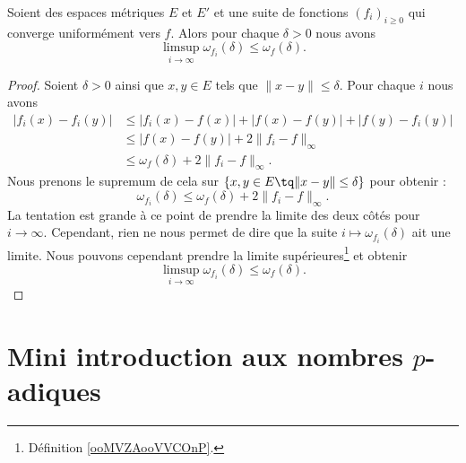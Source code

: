\begin{lemma}        \label{LEMooKPPSooPIncvn}
    Soient des espaces métriques \( E\) et \( E'\) et une suite de fonctions \( (f_i)_{i\geq 0}\) qui converge uniformément vers \( f\). Alors pour chaque \( \delta>0\) nous avons
    \begin{equation}
        \limsup_{i\to \infty}\omega_{f_i}(\delta)\leq \omega_f(\delta).
    \end{equation}
\end{lemma}

\begin{proof}
    Soient \( \delta>0\) ainsi que \( x,y\in E\) tels que \( \| x-y \|\leq \delta\). Pour chaque \( i\) nous avons
    \begin{subequations}
        \begin{align}
            | f_i(x)-f_i(y) |&\leq | f_i(x)-f(x) |+| f(x)-f(y) |+| f(y)-f_i(y) |\\
            &\leq | f(x)-f(y) |+2\| f_i-f \|_{\infty}\\
            &\leq \omega_f(\delta)+2\| f_i-f \|_{\infty}.
        \end{align}
    \end{subequations}
    Nous prenons le supremum de cela sur \( \{  x,y\in E\tq \| x-y \|\leq \delta \}\) pour obtenir :
    \begin{equation}
        \omega_{f_i}(\delta)\leq \omega_f(\delta)+2\| f_i-f \|_{\infty}.
    \end{equation}
    La tentation est grande à ce point de prendre la limite des deux côtés pour \( i\to \infty\). Cependant, rien ne nous permet de dire que la suite \( i\mapsto   \omega_{f_i}(\delta)  \) ait une limite. Nous pouvons cependant prendre la limite supérieures\footnote{Définition \ref{ooMVZAooVVCOnP}.} et obtenir
    \begin{equation}
        \limsup_{i\to \infty}\omega_{f_i}(\delta)\leq \omega_f(\delta).
    \end{equation}
\end{proof}

\section{Mini introduction aux nombres \texorpdfstring{\( p\)}{p}-adiques}

